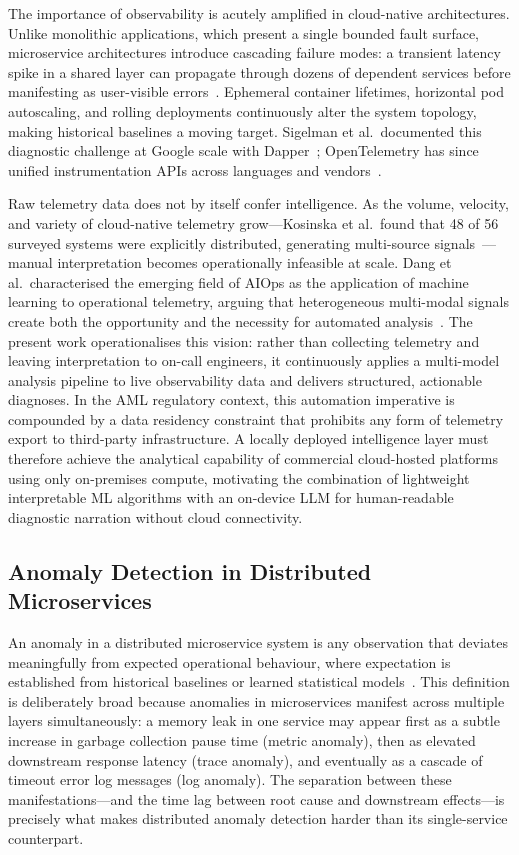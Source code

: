 \documentclass[a4paper,anonymous,UKenglish]{lipics-v2021}
\begin{document}
The importance of observability is acutely amplified in cloud-native
architectures. Unlike monolithic applications, which present a single bounded
fault surface, microservice architectures introduce cascading failure modes:
a transient latency spike in a shared layer can propagate through dozens of
dependent services before manifesting as user-visible
errors~\cite{soldani2022anomaly}. Ephemeral container lifetimes, horizontal
pod autoscaling, and rolling deployments continuously alter the system
topology, making historical baselines a moving target. Sigelman et al.\
documented this diagnostic challenge at Google scale with
Dapper~\cite{sigelman2010dapper}; OpenTelemetry has since unified
instrumentation APIs across languages and vendors~\cite{opentelemetry2023}.

Raw telemetry data does not by itself confer intelligence. As the volume,
velocity, and variety of cloud-native telemetry grow---Kosinska et al.\ found
that 48 of 56 surveyed systems were explicitly distributed, generating
multi-source signals~\cite{kosinska2023toward}---manual interpretation becomes
operationally infeasible at scale. Dang et al.\ characterised the emerging
field of AIOps as the application of machine learning to operational telemetry,
arguing that heterogeneous multi-modal signals create both the opportunity and
the necessity for automated analysis~\cite{dang2019aiops}. The present work
operationalises this vision: rather than collecting telemetry and leaving
interpretation to on-call engineers, it continuously applies a multi-model
analysis pipeline to live observability data and delivers structured,
actionable diagnoses. In the AML regulatory context, this automation imperative
is compounded by a data residency constraint that prohibits any form of
telemetry export to third-party infrastructure. A locally deployed intelligence
layer must therefore achieve the analytical capability of commercial
cloud-hosted platforms using only on-premises compute, motivating the
combination of lightweight interpretable ML algorithms with an on-device LLM
for human-readable diagnostic narration without cloud connectivity.

\subsection{Anomaly Detection in Distributed Microservices}

An anomaly in a distributed microservice system is any observation that
deviates meaningfully from expected operational behaviour, where expectation is
established from historical baselines or learned statistical
models~\cite{soldani2022anomaly}. This definition is deliberately broad because
anomalies in microservices manifest across multiple layers simultaneously:
a memory leak in one service may appear first as a subtle increase in garbage
collection pause time (metric anomaly), then as elevated downstream response
latency (trace anomaly), and eventually as a cascade of timeout error log
messages (log anomaly). The separation between these manifestations---and the
time lag between root cause and downstream effects---is precisely what makes
distributed anomaly detection harder than its single-service counterpart.
\end{document}
